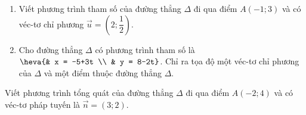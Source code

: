 \begin{bt}%
	\begin{enumerate}
		\item Viết phương trình tham số của đường thẳng $\Delta$ đi qua điểm $A(-1;3)$ và có véc-tơ chỉ phương $\overrightarrow{u}=\left(2;\dfrac{1}{2}\right)$.
		\item Cho đường thẳng $\Delta$ có phương trình tham số là $\heva{& x = -5+3t \\ & y = 8-2t}$. Chỉ ra tọa độ một véc-tơ chỉ phương của $\Delta$ và một điểm thuộc đường thẳng $\Delta$.
	\end{enumerate}
\end{bt}

\begin{bt}%
	Viết phương trình tổng quát của đường thẳng $\Delta$ đi qua điểm $A(-2;4)$ và có véc-tơ pháp tuyến là $\overrightarrow{n}=(3;2)$.
\end{bt}

